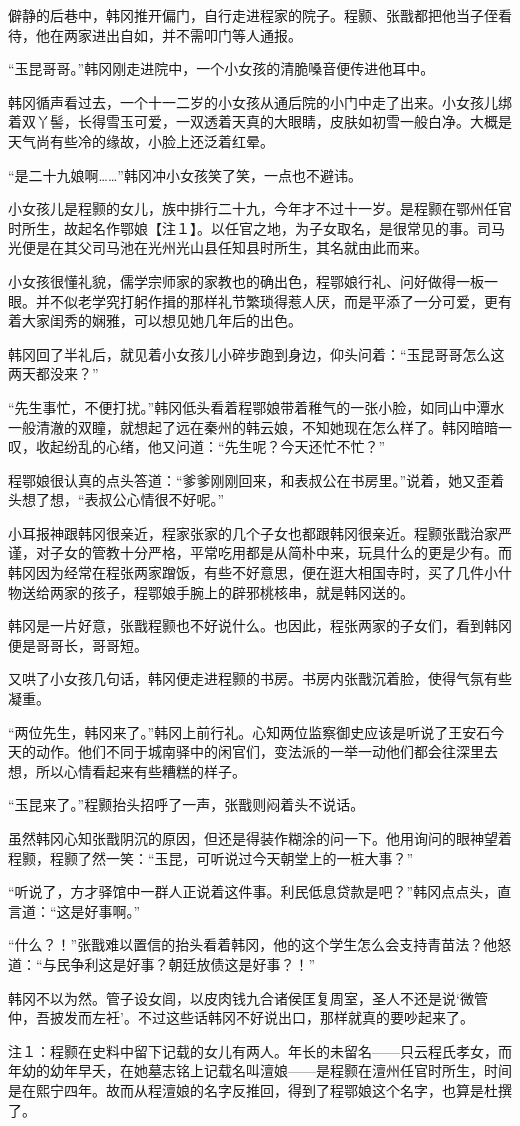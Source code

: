 僻静的后巷中，韩冈推开偏门，自行走进程家的院子。程颢、张戬都把他当子侄看待，他在两家进出自如，并不需叩门等人通报。

“玉昆哥哥。”韩冈刚走进院中，一个小女孩的清脆嗓音便传进他耳中。

韩冈循声看过去，一个十一二岁的小女孩从通后院的小门中走了出来。小女孩儿绑着双丫髻，长得雪玉可爱，一双透着天真的大眼睛，皮肤如初雪一般白净。大概是天气尚有些冷的缘故，小脸上还泛着红晕。

“是二十九娘啊……”韩冈冲小女孩笑了笑，一点也不避讳。

小女孩儿是程颢的女儿，族中排行二十九，今年才不过十一岁。是程颢在鄂州任官时所生，故起名作鄂娘【注１】。以任官之地，为子女取名，是很常见的事。司马光便是在其父司马池在光州光山县任知县时所生，其名就由此而来。

小女孩很懂礼貌，儒学宗师家的家教也的确出色，程鄂娘行礼、问好做得一板一眼。并不似老学究打躬作揖的那样礼节繁琐得惹人厌，而是平添了一分可爱，更有着大家闺秀的娴雅，可以想见她几年后的出色。

韩冈回了半礼后，就见着小女孩儿小碎步跑到身边，仰头问着：“玉昆哥哥怎么这两天都没来？”

“先生事忙，不便打扰。”韩冈低头看着程鄂娘带着稚气的一张小脸，如同山中潭水一般清澈的双瞳，就想起了远在秦州的韩云娘，不知她现在怎么样了。韩冈暗暗一叹，收起纷乱的心绪，他又问道：“先生呢？今天还忙不忙？”

程鄂娘很认真的点头答道：“爹爹刚刚回来，和表叔公在书房里。”说着，她又歪着头想了想，“表叔公心情很不好呢。”

小耳报神跟韩冈很亲近，程家张家的几个子女也都跟韩冈很亲近。程颢张戬治家严谨，对子女的管教十分严格，平常吃用都是从简朴中来，玩具什么的更是少有。而韩冈因为经常在程张两家蹭饭，有些不好意思，便在逛大相国寺时，买了几件小什物送给两家的孩子，程鄂娘手腕上的辟邪桃核串，就是韩冈送的。

韩冈是一片好意，张戬程颢也不好说什么。也因此，程张两家的子女们，看到韩冈便是哥哥长，哥哥短。

又哄了小女孩几句话，韩冈便走进程颢的书房。书房内张戬沉着脸，使得气氛有些凝重。

“两位先生，韩冈来了。”韩冈上前行礼。心知两位监察御史应该是听说了王安石今天的动作。他们不同于城南驿中的闲官们，变法派的一举一动他们都会往深里去想，所以心情看起来有些糟糕的样子。

“玉昆来了。”程颢抬头招呼了一声，张戬则闷着头不说话。

虽然韩冈心知张戬阴沉的原因，但还是得装作糊涂的问一下。他用询问的眼神望着程颢，程颢了然一笑：“玉昆，可听说过今天朝堂上的一桩大事？”

“听说了，方才驿馆中一群人正说着这件事。利民低息贷款是吧？”韩冈点点头，直言道：“这是好事啊。”

“什么？！”张戬难以置信的抬头看着韩冈，他的这个学生怎么会支持青苗法？他怒道：“与民争利这是好事？朝廷放债这是好事？！”

韩冈不以为然。管子设女闾，以皮肉钱九合诸侯匡复周室，圣人不还是说‘微管仲，吾披发而左衽’。不过这些话韩冈不好说出口，那样就真的要吵起来了。

注１：程颢在史料中留下记载的女儿有两人。年长的未留名——只云程氏孝女，而年幼的幼年早夭，在她墓志铭上记载名叫澶娘——是程颢在澶州任官时所生，时间是在熙宁四年。故而从程澶娘的名字反推回，得到了程鄂娘这个名字，也算是杜撰了。

